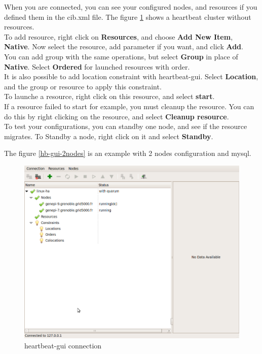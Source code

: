 \documentclass[a4paper,10pt]{report}
\begin{document}
When you are connected, you can see your configured nodes, and resources if you defined them in the cib.xml file. The figure \ref{hb-gui-connect} shows a heartbeat cluster without resources.\\

To add resource, right click on \textbf{Resources}, and choose \textbf{Add New Item}, \textbf{Native}. Now select the resource, add parameter if you want, and click \textbf{Add}.\\
You can add group with the same operations, but select \textbf{Group} in place of \textbf{Native}. Select \textbf{Ordered} for launched resources with order.\\

It is also possible to add location constraint with heartbeat-gui. Select \textbf{Location}, and the group or resource to apply this constraint.\\

To launche a resource, right click on this resource, and select \textbf{start}.\\

If a resource failed to start for example, you must cleanup the resource. You can do this by right clicking on the resource, and select \textbf{Cleanup resource}.\\

To test your configurations, you can standby one node, and see if the resource migrates. To Standby a node, right click on it and select \textbf{Standby}.

The figure \ref{hb-gui-2nodes} is an example with 2 nodes configuration and mysql.

\begin{figure}[H]
\centering
\includegraphics[scale=0.4]{schema/hb_gui-2nodes-connect.png}
\caption{heartbeat-gui connection} 
\label{hb-gui-connect} 
\end{figure}
\end{document}
